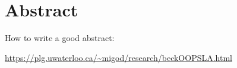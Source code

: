 


\begingroup
\let\clearpage\relax
\let\cleardoublepage\relax
\let\cleardoublepage\relax

\chapter*{Abstract}
How to write a good abstract:
\begin{center}
\url{https://plg.uwaterloo.ca/~migod/research/beckOOPSLA.html}
\end{center}

\endgroup			

\vfill
